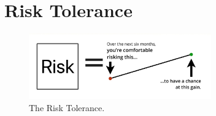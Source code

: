 
\section{Risk Tolerance}

\begin{figure}[!h]
\centering
\includegraphics[width=0.7\textwidth]{Tolerance.PNG}
\caption{The Risk Tolerance.}
\end{figure}


